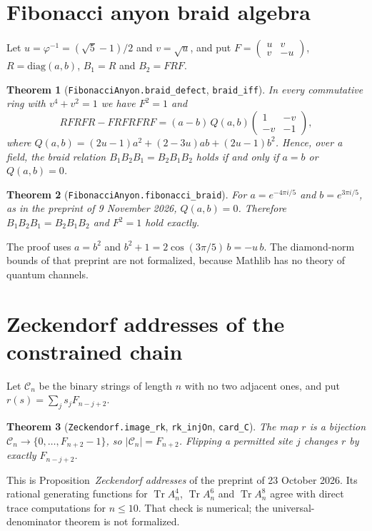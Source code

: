 \documentclass[11pt]{article}
\newtheorem{theorem}{Theorem}[section]
\theoremstyle{remark}
\newcommand{\lean}[1]{\texttt{#1}}
\begin{document}
\section{Fibonacci anyon braid algebra}
Let $u=\varphi^{-1}=(\sqrt5-1)/2$ and $v=\sqrt u$, and put
$F=\begin{pmatrix}u&v\\v&-u\end{pmatrix}$, $R=\mathrm{diag}(a,b)$, $B_1=R$ and $B_2=FRF$.
\begin{theorem}[\lean{FibonacciAnyon.braid\_defect}, \lean{braid\_iff}]
In every commutative ring with $v^4+v^2=1$ we have $F^2=1$ and
\[
RFRFR-FRFRFRF=(a-b)\,Q(a,b)\begin{pmatrix}1&-v\\-v&-1\end{pmatrix},
\]
where $Q(a,b)=(2u-1)a^2+(2-3u)ab+(2u-1)b^2$. Hence, over a field, the braid relation
$B_1B_2B_1=B_2B_1B_2$ holds if and only if $a=b$ or $Q(a,b)=0$.
\end{theorem}
\begin{theorem}[\lean{FibonacciAnyon.fibonacci\_braid}]
For $a=e^{-4\pi i/5}$ and $b=e^{3\pi i/5}$, as in the preprint of 9 November 2026,
$Q(a,b)=0$. Therefore $B_1B_2B_1=B_2B_1B_2$ and $F^2=1$ hold exactly.
\end{theorem}
The proof uses $a=b^2$ and $b^2+1=2\cos(3\pi/5)\,b=-u\,b$. The diamond-norm bounds of that
preprint are not formalized, because Mathlib has no theory of quantum channels.

\section{Zeckendorf addresses of the constrained chain}
Let $\mathcal C_n$ be the binary strings of length $n$ with no two adjacent ones, and put
$r(s)=\sum_j s_jF_{n-j+2}$.
\begin{theorem}[\lean{Zeckendorf.image\_rk}, \lean{rk\_injOn}, \lean{card\_C}]
The map $r$ is a bijection $\mathcal C_n\to\{0,\dots,F_{n+2}-1\}$, so
$|\mathcal C_n|=F_{n+2}$. Flipping a permitted site $j$ changes $r$ by exactly $F_{n-j+2}$.
\end{theorem}
This is Proposition~\emph{Zeckendorf addresses} of the preprint of 23 October 2026. Its
rational generating functions for $\operatorname{Tr}A_n^4$, $\operatorname{Tr}A_n^6$ and
$\operatorname{Tr}A_n^8$ agree with direct trace computations for $n\le10$. That check is
numerical; the universal-denominator theorem is not formalized.
\end{document}
